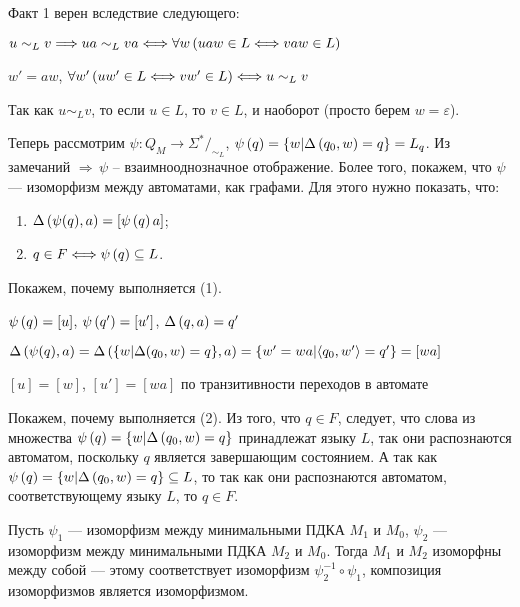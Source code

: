 Факт 1 верен вследствие следующего:

\begin{center}
    $u \sim_L v \Longrightarrow ua \sim_L va \Longleftrightarrow \forall w \left({uaw \in L \Longleftrightarrow vaw \in L}\right)$
    
    $w' = aw$, $\forall w' \left({uw' \in L \Longleftrightarrow vw' \in L}\right) \Longleftrightarrow u \sim_L v$
\end{center}

Так как $u \sim_L v$, то если $u \in L$, то $v \in L$, и наоборот (просто берем $w=\varepsilon$).

Теперь рассмотрим $\psi : Q_M \rightarrow \Sigma^* /_{\sim_L}$, $\psi \left({q}\right) = \{ w | \Delta \left({q_0, w}\right) = q \} = L_q$. Из замечаний $\Longrightarrow \, \psi $ -- взаимнооднозначное отображение. Более того, покажем, что $\psi$ — изоморфизм между автоматами, как графами. Для этого нужно показать, что:

\begin{enumerate}
    \item $\Delta \left({\psi(q), a}\right) = [\psi\left({q}\right)a]$;
    \item $q \in F \Longleftrightarrow \psi \left({q}\right) \subseteq L$.
\end{enumerate}

Покажем, почему выполняется (1).

\begin{center}
    $\psi \left({q}\right) = [u]$, $\psi \left({q'}\right) = [u']$, $\Delta \left({q, a}\right) = q'$
    
    $\Delta \left({\psi(q), a}\right) = \Delta \left({\{ w | \Delta(q_0, w) = q \}, a}\right) = \{ w' = wa | \langle q_0, w' \rangle = q'\} = [wa]$
    
    $[u] = [w]$, $[u'] = [wa]$ по транзитивности переходов в автомате
\end{center}

Покажем, почему выполняется (2). Из того, что $q \in F$, следует, что слова из множества $\psi \left({q}\right) = \{ w | \Delta \left({q_0, w}\right) = q \}$ принадлежат языку $L$, так они распознаются автоматом, поскольку $q$ является завершающим состоянием. А так как $\psi \left({q}\right) = \{ w | \Delta \left({q_0, w}\right) = q \} \subseteq L$, то так как они распознаются автоматом, соответствующему языку $L$, то $q \in F$.

Пусть $\psi_1$ — изоморфизм между минимальными ПДКА $M_1$ и $M_0$, $\psi_2$ — изоморфизм между минимальными ПДКА $M_2$ и $M_0$. Тогда $M_1$ и $M_2$ изоморфны между собой — этому соответствует изоморфизм $\psi_2^{-1} \circ \psi_1$, композиция изоморфизмов является изоморфизмом.
\EndProof